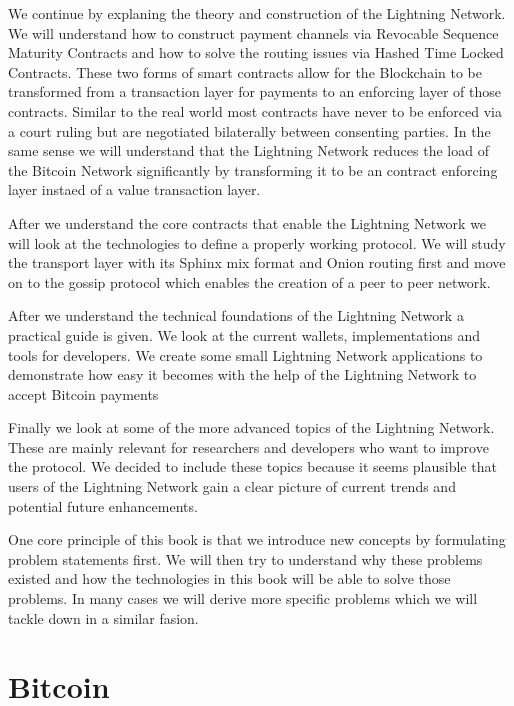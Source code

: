 \documentclass[ebook,12pt,oneside,openany]{memoir}
\begin{document}
We continue by explaning the theory and construction of the Lightning Network.
We will understand how to construct payment channels via Revocable Sequence Maturity Contracts and how to solve the routing issues via Hashed Time Locked Contracts.
These two forms of smart contracts allow for the Blockchain to be transformed from a transaction layer for payments to an enforcing layer of those contracts.
Similar to the real world most contracts have never to be enforced via a court ruling but are negotiated bilaterally between consenting parties.
In the same sense we will understand that the Lightning Network reduces the load of the Bitcoin Network significantly by transforming it to be an contract enforcing layer instaed of a value transaction layer.

After we understand the core contracts that enable the Lightning Network we will look at the technologies to define a properly working protocol.
We will study the transport layer with its Sphinx mix format and Onion routing first and move on to the gossip protocol which enables the creation of a peer to peer network.

After we understand the technical foundations of the Lightning Network a practical guide is given.
We look at the current wallets, implementations and tools for developers.
We create some small Lightning Network applications to demonstrate how easy it becomes with the help of the Lightning Network to accept Bitcoin payments

Finally we look at some of the more advanced topics of the Lightning Network.
These are mainly relevant for researchers and developers who want to improve the protocol.
We decided to include these topics because it seems plausible that users of the Lightning Network gain a clear picture of current trends and potential future enhancements. 

One core principle of this book is that we introduce new concepts by formulating problem statements first. We will then try to understand why these problems existed and how the technologies in this book will be able to solve those problems. In many cases we will derive more specific problems which we will tackle down in a similar fasion. 

\chapter{Bitcoin}
\end{document}
